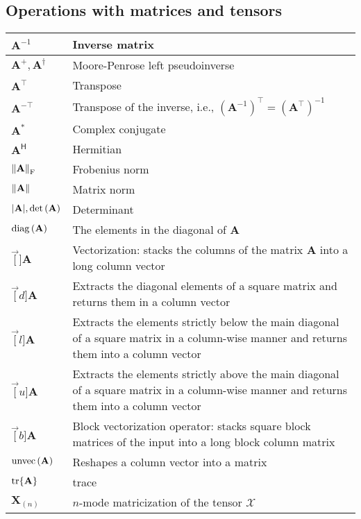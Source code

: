 \documentclass{article}
\begin{document}
\subsection{Operations with matrices and tensors}
\begin{xltabular}{\textwidth}{XX}
    \(\mathbf{A}^{-1}\) & Inverse matrix\\ \hline
    \(\mathbf{A}^+, \mathbf{A}^{\dagger}\) & Moore-Penrose left pseudoinverse\\ \hline
    \(\mathbf{A}^\top\) & Transpose\\ \hline
    \(\mathbf{A}^{-\top}\) & Transpose of the inverse, i.e., \(\left( \mathbf{A}^{-1} \right)^{\top} = \left( \mathbf{A}^{\top} \right)^{-1}\) \cite{petersenMatrixCookbook2008,golubMatrixComputations2013}\\ \hline
    \(\mathbf{A}^*\) & Complex conjugate\\ \hline
    \(\mathbf{A}^\mathsf{H}\) & Hermitian\\ \hline
    \(\norm{\mathbf{A}}_\textrm{F}\)& Frobenius norm \\ \hline
    \(\norm{\mathbf{A}}\) & Matrix norm\\ \hline
    \(\abs{\mathbf{A}}, \textnormal{det}\left( \mathbf{A} \right)\) & Determinant\\ \hline
    \(\operatorname{diag}\left(\mathbf{A}\right)\) & The elements in the diagonal of \(\mathbf{A}\) \\ \hline
    \(\vec[]{\mathbf{A}}\) &  Vectorization: stacks the columns of the matrix \(\mathbf{A}\) into a long column vector\\ \hline
    \(\vec[d]{\mathbf{A}}\) &  Extracts the diagonal elements of a square matrix and returns them
    in a column vector\\ \hline
    \(\vec[l]{\mathbf{A}}\) & Extracts the elements strictly below the main diagonal of a square matrix in a column-wise manner and returns them into a column vector\\ \hline
    \(\vec[u]{\mathbf{A}}\) & Extracts the elements strictly above the main diagonal of a square matrix in a column-wise manner and returns them into a column vector\\ \hline
    \(\vec[b]{\mathbf{A}}\) & Block vectorization operator: stacks square block matrices of the input into a long block column matrix\\ \hline
    \(\operatorname{unvec}\left(\mathbf{A}\right)\)& Reshapes a column vector into a matrix\\ \hline
    \(\tr{\mathbf{A}}\)& trace\\ \hline
    \(\mathbf{X}_{(n)}\) & \(n\)-mode matricization of the tensor \(\bm{\mathcal{X}}\)\\
\end{xltabular}
\end{document}
